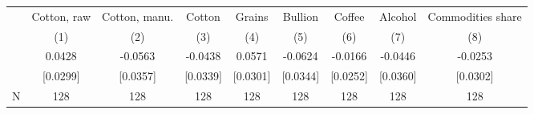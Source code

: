{
\def\sym#1{\ifmmode^{#1}\else\(^{#1}\)\fi}
\begin{tabular}{l*{8}{c}}
\toprule
            &\multicolumn{1}{c}{Cotton, raw}&\multicolumn{1}{c}{Cotton, manu.}&\multicolumn{1}{c}{Cotton}&\multicolumn{1}{c}{Grains}&\multicolumn{1}{c}{Bullion}&\multicolumn{1}{c}{Coffee}&\multicolumn{1}{c}{Alcohol}&\multicolumn{1}{c}{Commodities share}\\\cmidrule(lr){2-2}\cmidrule(lr){3-3}\cmidrule(lr){4-4}\cmidrule(lr){5-5}\cmidrule(lr){6-6}\cmidrule(lr){7-7}\cmidrule(lr){8-8}\cmidrule(lr){9-9}
            &\multicolumn{1}{c}{(1)}   &\multicolumn{1}{c}{(2)}   &\multicolumn{1}{c}{(3)}   &\multicolumn{1}{c}{(4)}   &\multicolumn{1}{c}{(5)}   &\multicolumn{1}{c}{(6)}   &\multicolumn{1}{c}{(7)}   &\multicolumn{1}{c}{(8)}   \\
\midrule
{}          &      0.0428   &     -0.0563   &     -0.0438   &      0.0571   &     -0.0624   &     -0.0166   &     -0.0446   &     -0.0253   \\
            &    [0.0299]   &    [0.0357]   &    [0.0339]   &    [0.0301]   &    [0.0344]   &    [0.0252]   &    [0.0360]   &    [0.0302]   \\
\midrule
N           &         128   &         128   &         128   &         128   &         128   &         128   &         128   &         128   \\
\bottomrule
\end{tabular}
}
